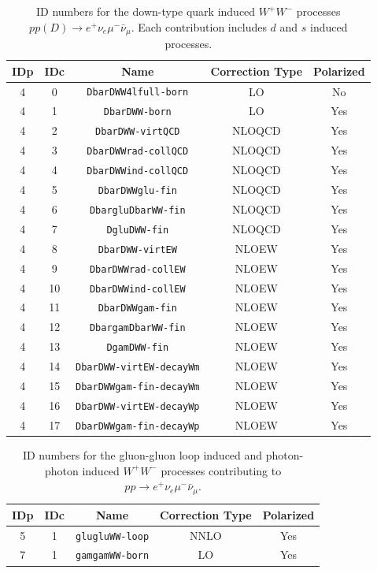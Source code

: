 \documentclass[english,12pt]{article}
\begin{document}
\begin{table}[th!]
\begin{center}
\begin{tabular}{|c|c|c|c|c|}\hline
IDp & IDc & Name & Correction Type & Polarized \\
\hline
4 & 0 & {\tt DbarDWW4lfull-born} & LO & No\\
4 & 1 & {\tt DbarDWW-born} & LO & Yes\\
4 & 2 & {\tt DbarDWW-virtQCD} & NLOQCD & Yes\\
4 & 3 & {\tt DbarDWWrad-collQCD} & NLOQCD & Yes\\
4 & 4 & {\tt DbarDWWind-collQCD} & NLOQCD & Yes\\
4 & 5 & {\tt DbarDWWglu-fin} & NLOQCD & Yes\\
4 & 6 & {\tt DbargluDbarWW-fin} & NLOQCD & Yes\\
4 & 7 & {\tt DgluDWW-fin} & NLOQCD & Yes\\
4 & 8 & {\tt DbarDWW-virtEW} & NLOEW & Yes\\
4 & 9 & {\tt DbarDWWrad-collEW} & NLOEW & Yes\\
4 & 10 & {\tt DbarDWWind-collEW} & NLOEW & Yes\\
4 & 11 & {\tt DbarDWWgam-fin} & NLOEW & Yes\\
4 & 12 & {\tt DbargamDbarWW-fin} & NLOEW & Yes\\
4 & 13 & {\tt DgamDWW-fin} & NLOEW & Yes\\
4 & 14 & {\tt DbarDWW-virtEW-decayWm} & NLOEW & Yes\\
4 & 15 & {\tt DbarDWWgam-fin-decayWm} & NLOEW & Yes\\
4 & 16 & {\tt DbarDWW-virtEW-decayWp} & NLOEW & Yes\\
4 & 17 & {\tt DbarDWWgam-fin-decayWp} & NLOEW & Yes\\
\hline
\end{tabular}
\caption{\small ID numbers for the down-type quark induced $W^+W^-$ processes $pp(D) \to e^+\nu_e\mu^-\bar{\nu}_\mu$. 
Each contribution includes $d$ and $s$ induced processes.}
\label{tab:IDs_proc_cont_WW_D}
\end{center}
\end{table}

\begin{table}[th!]
\begin{center}
\begin{tabular}{|c|c|c|c|c|}\hline
IDp & IDc & Name & Correction Type & Polarized \\
\hline
5 & 1 & {\tt glugluWW-loop} & NNLO & Yes\\
7 & 1 & {\tt gamgamWW-born} & LO & Yes\\
\hline
\end{tabular}
\caption{\small ID numbers for the gluon-gluon loop induced and photon-photon induced $W^+W^-$ processes contributing to $pp \to e^+\nu_e\mu^-\bar{\nu}_\mu$.}
\label{tab:IDs_proc_cont_WW_gg_aa}
\end{center}
\end{table}
\end{document}
